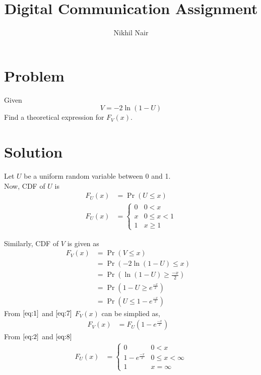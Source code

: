 \documentclass[journal,12pt,twocolumn]{IEEEtran}
\title{\mytitle}
\title{
Digital Communication Assignment
}
\author{Nikhil Nair}
\providecommand{\pr}[1]{\ensuremath{\Pr\left(#1\right)}}
\providecommand{\brak}[1]{\ensuremath{\left(#1\right)}}
\begin{document}
\maketitle
\bigskip


\section{\textbf{Problem }}
Given 
\begin{equation}
V = -2\ln\brak{1-U}  \nonumber
\end{equation}
Find a theoretical expression for $F_V (x)$.

\section{\textbf{Solution }}
Let $U$ be a uniform random variable between 0 and 1.
\\
Now, CDF of $U$ is 
\begin{align}
F_{U}(x) &= \pr{U \le x}   \label{eq:1}
\\
F_{U}(x)  &= 
\begin{cases}
0 & 0 < x 
\\
x & 0 \le x < 1
\\ 
1 &  x \ge 1                \label{eq:2}
\end{cases}
\end{align}

Similarly, CDF of $V$ is given as
\begin{align}
F_{V}(x) &= \pr{V \le x}&
\\
&= \pr{-2\ln\brak{1-U} \le x}&
\\
&= \pr{\ln\brak{1-U} \ge \frac{-x}{2}}&
\\
&= \pr{1-U \ge e^{\frac{-x}{2}}}&
\\
&= \pr{U \le 1-e^{\frac{-x}{2}}}&  \label{eq:7}
\end{align}
From $\eqref{eq:1}$ and $\eqref{eq:7}$ $F_V (x)$ can be simplied as,
\begin{align}
F_{V}(x) &= F_{U}(1-e^{\frac{-x}{2}})&    \label{eq:8}
\end{align}
From $\eqref{eq:2}$ and $\eqref{eq:8}$
\begin{align}
F_{U}(x)  &= 
\begin{cases}
0 & 0 < x 
\\
1-e^{\frac{-x}{2}} & 0 \le x < \infty
\\ 
1 &  x = \infty                
\end{cases}
\end{align}
\end{document}
